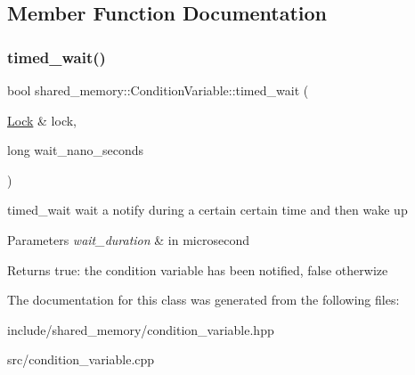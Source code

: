 \subsection{Member Function Documentation}
\mbox{\label{classshared__memory_1_1ConditionVariable_af7b1ce584ff9ef9a0925f57cae8e6263}} 
\subsubsection{\texorpdfstring{timed\+\_\+wait()}{timed\_wait()}}
{\footnotesize\ttfamily bool shared\+\_\+memory\+::\+Condition\+Variable\+::timed\+\_\+wait (\begin{DoxyParamCaption}\item[{\hyperlink{classshared__memory_1_1Lock}{Lock} \&}]{lock,  }\item[{long}]{wait\+\_\+nano\+\_\+seconds }\end{DoxyParamCaption})}



timed\+\_\+wait wait a notify during a certain certain time and then wake up 


\begin{DoxyParams}{Parameters}
{\em wait\+\_\+duration} & in microsecond \\
\hline
\end{DoxyParams}
\begin{DoxyReturn}{Returns}
true\+: the condition variable has been notified, false otherwize 
\end{DoxyReturn}


The documentation for this class was generated from the following files\+:\begin{DoxyCompactItemize}
\item 
include/shared\+\_\+memory/condition\+\_\+variable.\+hpp\item 
src/condition\+\_\+variable.\+cpp\end{DoxyCompactItemize}
